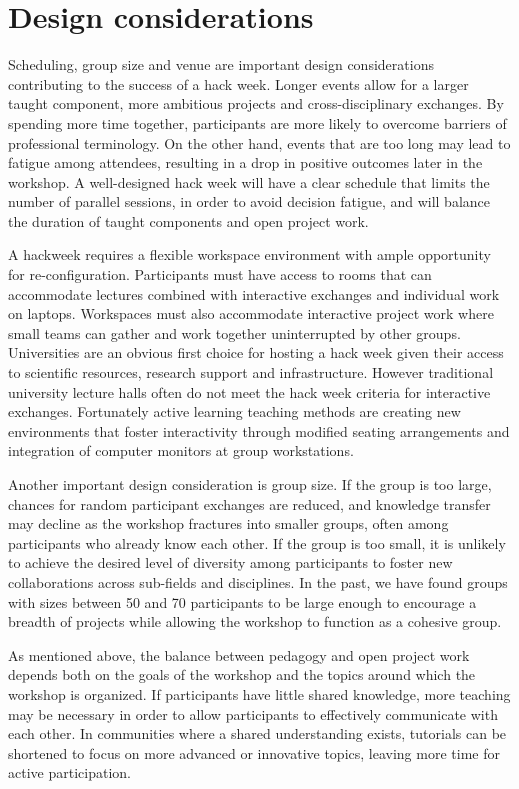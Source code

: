 \section*{Design considerations}

Scheduling, group size and venue are important design considerations contributing to the success of a hack week.   
Longer events allow for a larger taught component, more ambitious projects and cross-disciplinary exchanges. 
By spending more time together, participants are more likely to overcome barriers of professional terminology.
On the other hand, events that are too long may lead to fatigue among attendees, resulting in a drop in positive outcomes later in the workshop.
A well-designed hack week will have a clear schedule that limits the number of parallel sessions, in order to avoid decision fatigue, and will balance the duration of taught components and open project work. 

A hackweek requires a flexible workspace environment with ample opportunity for re-configuration. 
Participants must have access to rooms that can accommodate lectures combined with interactive exchanges and individual work on laptops. 
Workspaces must also accommodate interactive project work where small teams can gather and work together uninterrupted by other groups.    
Universities are an obvious first choice for hosting a hack week given their access to scientific resources, research support and infrastructure. 
However traditional university lecture halls often do not meet the hack week criteria for interactive exchanges.
Fortunately active learning teaching methods are creating new environments that foster interactivity through modified seating arrangements and integration of computer monitors at group workstations.

Another important design consideration is group size.
If the group is too large, chances for random participant exchanges are reduced, and knowledge transfer may decline as the workshop fractures into smaller groups, often among participants who already know each other.
If the group is too small, it is unlikely to achieve the desired level of diversity among participants to foster new collaborations across sub-fields and disciplines.
In the past, we have found groups with sizes between 50 and 70 participants to be large enough to encourage a breadth of projects while allowing the workshop to function as a cohesive group.

As mentioned above, the balance between pedagogy and open project work depends both on the goals of the workshop and the topics around which the workshop is organized.
If participants have little shared knowledge, more teaching may be necessary in order to allow participants to effectively communicate with each other.
In communities where a shared understanding exists, tutorials can be shortened to focus on more advanced or innovative topics, leaving more time for active participation.

